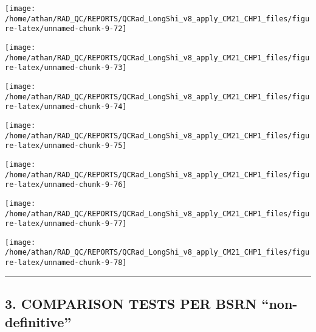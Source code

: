 \documentclass[
  10pt,
  a4paper,oneside]{article}
\begin{document}
\begin{center}\texttt{[image: /home/athan/RAD\_QC/REPORTS/QCRad\_LongShi\_v8\_apply\_CM21\_CHP1\_files/figure-latex/unnamed-chunk-9-72]} \end{center}

\begin{center}\texttt{[image: /home/athan/RAD\_QC/REPORTS/QCRad\_LongShi\_v8\_apply\_CM21\_CHP1\_files/figure-latex/unnamed-chunk-9-73]} \end{center}

\begin{center}\texttt{[image: /home/athan/RAD\_QC/REPORTS/QCRad\_LongShi\_v8\_apply\_CM21\_CHP1\_files/figure-latex/unnamed-chunk-9-74]} \end{center}

\begin{center}\texttt{[image: /home/athan/RAD\_QC/REPORTS/QCRad\_LongShi\_v8\_apply\_CM21\_CHP1\_files/figure-latex/unnamed-chunk-9-75]} \end{center}

\begin{center}\texttt{[image: /home/athan/RAD\_QC/REPORTS/QCRad\_LongShi\_v8\_apply\_CM21\_CHP1\_files/figure-latex/unnamed-chunk-9-76]} \end{center}

\begin{center}\texttt{[image: /home/athan/RAD\_QC/REPORTS/QCRad\_LongShi\_v8\_apply\_CM21\_CHP1\_files/figure-latex/unnamed-chunk-9-77]} \end{center}

\begin{center}\texttt{[image: /home/athan/RAD\_QC/REPORTS/QCRad\_LongShi\_v8\_apply\_CM21\_CHP1\_files/figure-latex/unnamed-chunk-9-78]} \end{center}

\begin{center}\rule{0.5\linewidth}{0.5pt}\end{center}

\newpage

\hypertarget{comparison-tests-per-bsrn-non-definitive}{%
\subsection{3. COMPARISON TESTS PER BSRN ``non-definitive''}\label{comparison-tests-per-bsrn-non-definitive}}
\end{document}
